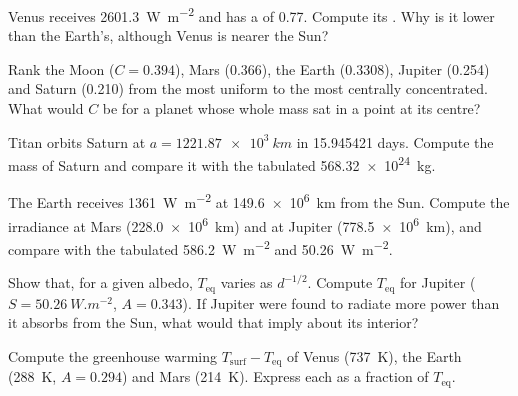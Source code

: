 \begin{exercise}[$\star$]\label{exo:b1:comparative-planetology:3}
Venus receives \qty{2601.3}{W.m^{-2}} and has a  of 0.77.
Compute its . Why is it lower than the Earth's,
although Venus is nearer the Sun?
\end{exercise}

\begin{exercise}[$\star$]\label{exo:b1:comparative-planetology:4}
Rank the Moon ($C = 0.394$), Mars (0.366), the Earth (0.3308), Jupiter
(0.254) and Saturn (0.210) from the most uniform to the most centrally
concentrated. What would $C$ be for a planet whose whole mass sat in a point
at its centre?
\end{exercise}

\begin{exercise}[$\star\star$]\label{exo:b1:comparative-planetology:5}
Titan orbits Saturn at $a = \qty{1221.87e3}{km}$ in \num{15.945421} days.
Compute the mass of Saturn and compare it with the tabulated
\qty{568.32e24}{kg}.
\end{exercise}

\begin{exercise}[$\star\star$]\label{exo:b1:comparative-planetology:6}
The Earth receives \qty{1361}{W.m^{-2}} at \qty{149.6e6}{km} from the Sun.
Compute the irradiance at Mars (\qty{228.0e6}{km}) and at Jupiter
(\qty{778.5e6}{km}), and compare with the tabulated \qty{586.2}{W.m^{-2}}
and \qty{50.26}{W.m^{-2}}.
\end{exercise}

\begin{exercise}[$\star\star$]\label{exo:b1:comparative-planetology:7}
Show that, for a given albedo, $T_\mathrm{eq}$ varies as $d^{-1/2}$. Compute
$T_\mathrm{eq}$ for Jupiter ($S = \qty{50.26}{W.m^{-2}}$, $A = 0.343$).
If Jupiter were found to radiate more power than it absorbs from the Sun,
what would that imply about its interior?
\end{exercise}

\begin{exercise}[$\star\star$]\label{exo:b1:comparative-planetology:8}
Compute the greenhouse warming $T_\mathrm{surf} - T_\mathrm{eq}$ of Venus
(\qty{737}{K}), the Earth (\qty{288}{K}, $A = 0.294$) and Mars
(\qty{214}{K}). Express each as a fraction of $T_\mathrm{eq}$.
\end{exercise}


